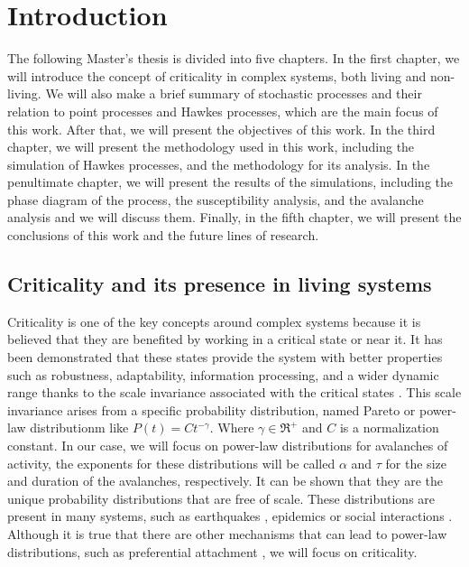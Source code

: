 \chapter{Introduction}\label{ch:intro}

The following Master's thesis is divided into five chapters. In the first chapter, we will introduce the concept of criticality in complex systems, both living and non-living.  
We will also make a brief summary of stochastic processes and their relation to point processes and Hawkes processes, which are the main focus of this work.
After that, we will present the objectives of this work. In the third chapter, we will present the methodology used in this work, including the simulation of Hawkes processes, 
and the methodology for its analysis. In the penultimate chapter, we will present the results of the simulations, including the phase diagram of the process, the 
susceptibility analysis, and the avalanche analysis and we will discuss them. Finally, in the fifth chapter, we will present the conclusions of this work and the future lines of research.

\section{Criticality and its presence in living systems}

Criticality is one of the key concepts around complex systems because it is believed that they are benefited by working in a critical state or near it. It has been demonstrated that
these states provide the system with better properties such as robustness, adaptability, information processing, and a wider dynamic range thanks to the scale invariance associated with the
critical states \cite{munoz2018colloquium}. This scale invariance arises from a specific probability distribution, named Pareto or power-law distributionm like $P(t) = Ct^{-\gamma}$.
Where $\gamma\in\Re^+$ and $C$ is a normalization constant. In our case, we will focus on power-law distributions for avalanches of activity, the exponents for these distributions will be called
$\alpha$ and $\tau$ for the size and duration of the avalanches, respectively.
It can be shown that they are the unique probability distributions that are free of scale. These distributions are present
in many systems, such as earthquakes \cite{baiesi2004scale}, epidemics \cite{pastor2015epidemic} or social interactions \cite{castellano2009statistical, aparicio2015model}. 
Although it is true that there are other mechanisms that can lead to power-law distributions, such as preferential attachment \cite{barabasi1999emergence}, we will focus on criticality. 

